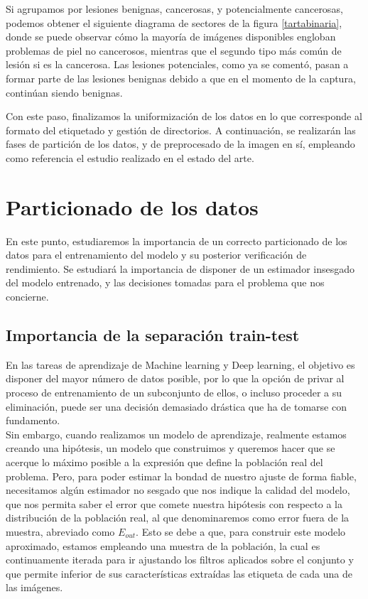 Si agrupamos por lesiones benignas, cancerosas, y potencialmente cancerosas, podemos obtener el siguiente diagrama de sectores de la figura \ref{tartabinaria}, donde se puede observar cómo la mayoría de imágenes disponibles engloban problemas de piel no cancerosos, mientras que el segundo tipo más común de lesión si es la cancerosa. Las lesiones potenciales, como ya se comentó, pasan a formar parte de las lesiones benignas debido a que en el momento de la captura, continúan siendo benignas.

Con este paso, finalizamos la uniformización de los datos en lo que corresponde al formato del etiquetado y gestión de directorios. A continuación, se realizarán las fases de partición de los datos, y de preprocesado de la imagen en sí, empleando como referencia el estudio realizado en el estado del arte.


\section{Particionado de los datos}

En este punto, estudiaremos la importancia de un correcto particionado de los datos para el entrenamiento del modelo y su posterior verificación de rendimiento. Se estudiará la importancia de disponer de un estimador insesgado del modelo entrenado, y las decisiones tomadas para el problema que nos concierne.

\subsection{Importancia de la separación train-test}
En las tareas de aprendizaje de Machine learning y Deep learning, el objetivo es disponer del mayor número de datos posible, por lo que la opción de privar al proceso de entrenamiento de un subconjunto de ellos, o incluso proceder a su eliminación, puede ser una decisión demasiado drástica que ha de tomarse con fundamento.\\

Sin embargo, cuando realizamos un modelo de aprendizaje, realmente estamos creando una hipótesis, un modelo que construimos y queremos hacer que se acerque lo máximo posible a la expresión que define la población real del problema. Pero, para poder estimar la bondad de nuestro ajuste de forma fiable, necesitamos algún estimador no sesgado que nos indique la calidad del modelo, que nos permita saber el error que comete nuestra hipótesis con respecto a la distribución de la población real, al que denominaremos como error fuera de la muestra, abreviado como $E_{out}$.  Esto se debe a que, para construir este modelo aproximado, estamos empleando una muestra de la población, la cual es continuamente iterada para ir ajustando los filtros aplicados sobre el conjunto y que permite inferior de sus características extraídas las etiqueta de cada una de las imágenes.\\

